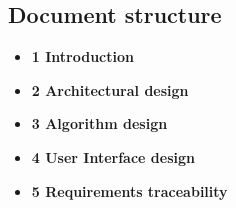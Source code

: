 \subsection{Document structure}
\label{subsect:document structure}
\begin{itemize}
    \item \textbf{1 Introduction} 
    \item \textbf{2 Architectural design}
    \item \textbf{3 Algorithm design}
    \item \textbf{4 User Interface design}
    \item \textbf{5 Requirements traceability}
\end{itemize}


